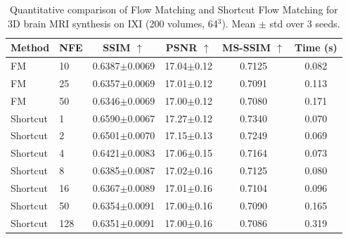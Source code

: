 \begin{table}[t]
\centering
\caption{Quantitative comparison of Flow Matching and Shortcut Flow Matching
for 3D brain MRI synthesis on IXI (200 volumes, 64$^3$). Mean $\pm$ std over 3 seeds.}
\label{tab:main_results}
\begin{tabular}{llcccc}
\toprule
Method & NFE & SSIM $\uparrow$ & PSNR $\uparrow$ & MS-SSIM $\uparrow$ & Time (s) \\
\midrule
FM & 10 & 0.6387$\pm$0.0069 & 17.04$\pm$0.12 & 0.7125 & 0.082 \\
FM & 25 & 0.6357$\pm$0.0069 & 17.01$\pm$0.12 & 0.7091 & 0.113 \\
FM & 50 & 0.6346$\pm$0.0069 & 17.00$\pm$0.12 & 0.7080 & 0.171 \\
\midrule
Shortcut & 1 & 0.6590$\pm$0.0067 & 17.27$\pm$0.12 & 0.7340 & 0.070 \\
Shortcut & 2 & 0.6501$\pm$0.0070 & 17.15$\pm$0.13 & 0.7249 & 0.069 \\
Shortcut & 4 & 0.6421$\pm$0.0083 & 17.06$\pm$0.15 & 0.7164 & 0.073 \\
Shortcut & 8 & 0.6385$\pm$0.0087 & 17.02$\pm$0.16 & 0.7125 & 0.080 \\
Shortcut & 16 & 0.6367$\pm$0.0089 & 17.01$\pm$0.16 & 0.7104 & 0.096 \\
Shortcut & 50 & 0.6354$\pm$0.0091 & 17.00$\pm$0.16 & 0.7090 & 0.165 \\
Shortcut & 128 & 0.6351$\pm$0.0091 & 17.00$\pm$0.16 & 0.7086 & 0.319 \\
\bottomrule
\end{tabular}
\end{table}